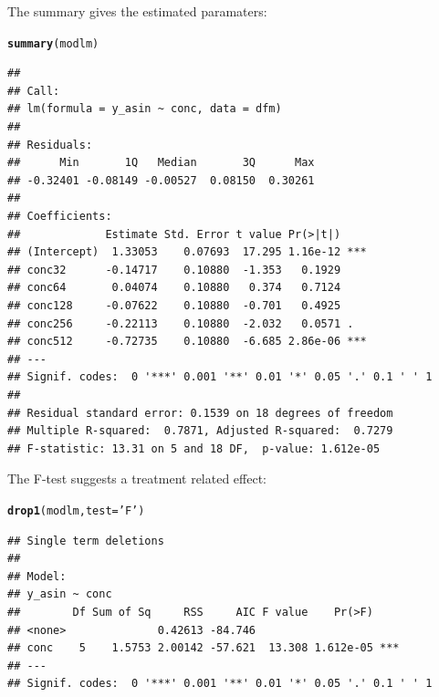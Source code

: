 \documentclass{scrartcl}\usepackage[]{graphicx}\usepackage[]{color}
\makeatletter
\newcommand{\hlstr}[1]{\textcolor[rgb]{0.192,0.494,0.8}{#1}}%
\newcommand{\hlstd}[1]{\textcolor[rgb]{0.345,0.345,0.345}{#1}}%
\newcommand{\hlkwc}[1]{\textcolor[rgb]{0.333,0.667,0.333}{#1}}%
\newcommand{\hlkwd}[1]{\textcolor[rgb]{0.737,0.353,0.396}{\textbf{#1}}}%
\newenvironment{kframe}{%
 \def\at@end@of@kframe{}%
 \ifinner\ifhmode%
  \def\at@end@of@kframe{\end{minipage}}%
  \begin{minipage}{\columnwidth}%
 \fi\fi%
 \def\FrameCommand##1{\hskip\@totalleftmargin \hskip-\fboxsep
 \colorbox{shadecolor}{##1}\hskip-\fboxsep
     \hskip-\linewidth \hskip-\@totalleftmargin \hskip\columnwidth}%
 \MakeFramed {\advance\hsize-\width
   \@totalleftmargin\z@ \linewidth\hsize
   \@setminipage}}%
 {\par\unskip\endMakeFramed%
 \at@end@of@kframe}
\newenvironment{knitrout}{}{} %
\makeatother
\begin{document}
The summary gives the estimated paramaters:
\begin{knitrout}
\color{fgcolor}\begin{kframe}
\begin{alltt}
\hlkwd{summary}\hlstd{(modlm)}
\end{alltt}
\begin{verbatim}
## 
## Call:
## lm(formula = y_asin ~ conc, data = dfm)
## 
## Residuals:
##      Min       1Q   Median       3Q      Max 
## -0.32401 -0.08149 -0.00527  0.08150  0.30261 
## 
## Coefficients:
##             Estimate Std. Error t value Pr(>|t|)    
## (Intercept)  1.33053    0.07693  17.295 1.16e-12 ***
## conc32      -0.14717    0.10880  -1.353   0.1929    
## conc64       0.04074    0.10880   0.374   0.7124    
## conc128     -0.07622    0.10880  -0.701   0.4925    
## conc256     -0.22113    0.10880  -2.032   0.0571 .  
## conc512     -0.72735    0.10880  -6.685 2.86e-06 ***
## ---
## Signif. codes:  0 '***' 0.001 '**' 0.01 '*' 0.05 '.' 0.1 ' ' 1
## 
## Residual standard error: 0.1539 on 18 degrees of freedom
## Multiple R-squared:  0.7871,	Adjusted R-squared:  0.7279 
## F-statistic: 13.31 on 5 and 18 DF,  p-value: 1.612e-05
\end{verbatim}
\end{kframe}
\end{knitrout}

The F-test suggests a treatment related effect:
\begin{knitrout}
\color{fgcolor}\begin{kframe}
\begin{alltt}
\hlkwd{drop1}\hlstd{(modlm,} \hlkwc{test} \hlstd{=} \hlstr{'F'}\hlstd{)}
\end{alltt}
\begin{verbatim}
## Single term deletions
## 
## Model:
## y_asin ~ conc
##        Df Sum of Sq     RSS     AIC F value    Pr(>F)    
## <none>              0.42613 -84.746                      
## conc    5    1.5753 2.00142 -57.621  13.308 1.612e-05 ***
## ---
## Signif. codes:  0 '***' 0.001 '**' 0.01 '*' 0.05 '.' 0.1 ' ' 1
\end{verbatim}
\end{kframe}
\end{knitrout}
\end{document}
